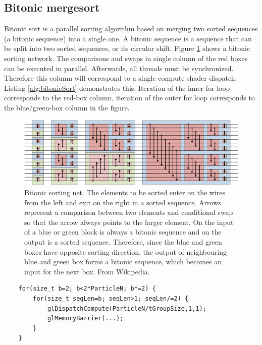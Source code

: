 \documentclass[a4paper,report]{IEEEtran}
\begin{document}
\subsection{Bitonic mergesort}
Bitonic sort is a parallel sorting algorithm based on merging two sorted sequences (a bitonic sequence) into a single one. A bitonic sequence is a sequence that can be split into two sorted sequences, or its circular shift. Figure \ref{fig:bitonicSort} shows a bitonic sorting network. The comparisons and swaps in single column of the red boxes can be executed in parallel. Afterwards, all threads must be synchronized. Therefore this column will correspond to a single compute shader dispatch. Listing \ref{alg:bitonicSort} demonstrates this. Iteration of the inner for loop corresponds to the red-box column, iteration of the outer for loop corresponds to the blue/green-box column in the figure.
\begin{figure}[!h]
\centering
\includegraphics[width=\textwidth]{BitonicSort}
\caption{Bitonic sorting net. The elements to be sorted enter on the wires from the left and exit on the right in a sorted sequence. Arrows represent a comparison between two elements and conditional swap so that the arrow always points to the larger element. On the input of a blue or green block is always a bitonic sequence and on the output is a sorted sequence. Therefore, since the blue and green boxes have opposite sorting direction, the output of neighbouring blue and green box forms a bitonic sequence, which becomes an input for the next box. From Wikipedia.}
\label{fig:bitonicSort}
\end{figure}

\lstset{language=C++,caption=Calls to the bitonic sort kernel,frame=single,label=alg:bitonicSort,captionpos=b,basicstyle= \footnotesize,tabsize=1} 
\begin{lstlisting}
	for(size_t b=2; b<2*ParticleN; b*=2) {
		for(size_t seqLen=b; seqLen>1; seqLen/=2) {
			glDispatchCompute(ParticleN/tGroupSize,1,1);
			glMemoryBarrier(...);
		}
	}
\end{lstlisting} 
\end{document}
